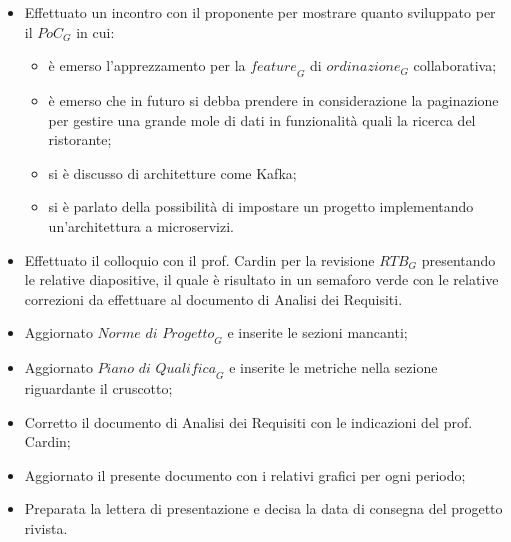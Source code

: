 \begin{itemize}
    \item Effettuato un incontro con il proponente per mostrare quanto sviluppato per il $\textit{PoC}_G$ in cui:
    \begin{itemize}
        \item è emerso l'apprezzamento per la $\textit{feature}_G$ di $\textit{ordinazione}_G$ collaborativa;
        \item è emerso che in futuro si debba prendere in considerazione la paginazione per gestire una grande mole di dati in funzionalità quali la ricerca del ristorante;
        \item si è discusso di architetture come Kafka;
        \item si è parlato della possibilità di impostare un progetto implementando un'architettura a microservizi.
    \end{itemize}
    \item Effettuato il colloquio con il prof. Cardin per la revisione $\textit{RTB}_G$ presentando le relative diapositive, il quale è risultato in un semaforo verde con le relative correzioni da effettuare al documento di Analisi dei Requisiti.
    \item Aggiornato $\textit{Norme di Progetto}_G$ e inserite le sezioni mancanti;
    \item Aggiornato $\textit{Piano di Qualifica}_G$ e inserite le metriche nella sezione riguardante il cruscotto;
    \item Corretto il documento di Analisi dei Requisiti con le indicazioni del prof. Cardin;
    \item Aggiornato il presente documento con i relativi grafici per ogni periodo;
    \item Preparata la lettera di presentazione e decisa la data di consegna del progetto rivista.
\end{itemize}

